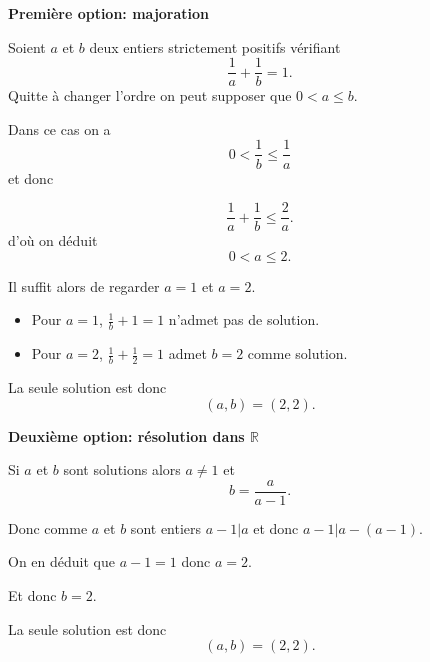 \begin{sol}

  \textbf{Première option: majoration}

  Soient $a$ et $b$ deux entiers strictement positifs vérifiant
  $$\frac{1}{a} + \frac{1}{b} = 1.$$
  Quitte à changer l'ordre on peut supposer que $0 < a \leq b$.

  Dans ce cas on a
  $$0 < \frac{1}{b} \leq \frac{1}{a}$$
  et donc

  $$\frac{1}{a} + \frac{1}{b} \leq \frac{2}{a}.$$
  d'où on déduit
  $$0 < a \leq 2.$$

  Il suffit alors de regarder $a = 1$ et $a=2$.

  \begin{itemize}
    \item Pour $a=1$, $\frac{1}{b} + 1 = 1$ n'admet pas de solution.
    \item Pour $a=2$, $\frac{1}{b} + \frac{1}{2} = 1$ admet $b=2$ comme solution.
  \end{itemize}

  La seule solution est donc
  $$\boxed{(a,b) = (2,2).}$$

  \textbf{Deuxième option: résolution dans $\mathbb{R}$}

  Si $a$ et $b$ sont solutions alors $a \neq 1$ et
  $$b = \frac{a}{a-1}.$$

  Donc comme $a$ et $b$ sont entiers $a-1 | a$ et donc $a-1| a-(a-1)$.

  On en déduit que $a-1 = 1$ donc $a=2$.

  Et donc $b=2$.

  La seule solution est donc
  $$\boxed{(a,b) = (2,2).}$$

\end{sol}

